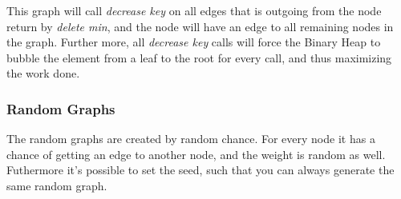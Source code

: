 This graph will call \textit{decrease key} on all edges that is outgoing from the node return by \textit{delete min}, and the node will have an edge to all remaining nodes in the graph. Further more, all \textit{decrease key} calls will force the Binary Heap to bubble the element from a leaf to the root for every call, and thus maximizing the work done.
 \subsubsection*{Random Graphs}
  The random graphs are created by random chance. For every node it has a chance of getting an edge to another node, and the weight is random as well. Futhermore it's possible to set the seed, such that you can always generate the same random graph.